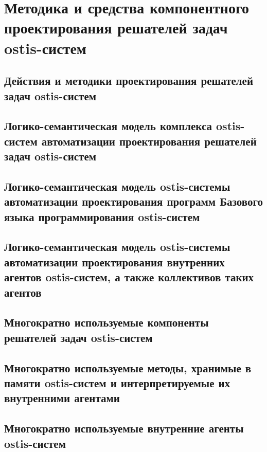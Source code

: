 \chapter{Методика и средства компонентного проектирования решателей задач ostis-систем}
\label{chapter_ps_design}


\section{Действия и методики проектирования решателей задач ostis-систем}
\section{Логико-семантическая модель комплекса ostis-систем автоматизации проектирования решателей задач ostis-систем}
\section{Логико-семантическая модель ostis-системы автоматизации проектирования программ Базового языка программирования ostis-систем}
\section{Логико-семантическая модель ostis-системы автоматизации проектирования внутренних агентов ostis-систем, а также коллективов таких агентов}
\section{Многократно используемые компоненты решателей задач ostis-систем}
\section{Многократно используемые методы, хранимые в памяти ostis-систем и интерпретируемые их внутренними агентами}
\section{Многократно используемые внутренние агенты ostis-систем}

%
